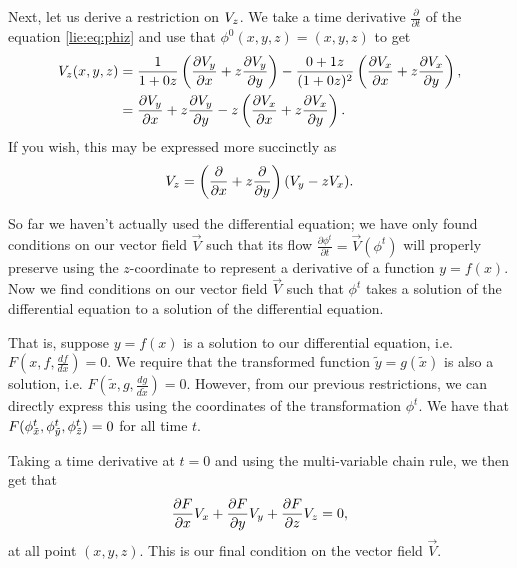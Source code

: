 Next, let us derive a restriction on \(V_z\). We take a time derivative \(\frac{\partial}{\partial t}\)
of the equation \ref{lie:eq:phiz} and use that \(\phi^0(x,y,z) = (x,y,z)\) to get
\begin{align}
V_z (x, y,z) & = \frac{1}{1 + 0z} \left( \frac{\partial V_y}{\partial x} + z \frac{\partial V_y}{\partial y}\right)
        - \frac{0 + 1z} {(1 + 0z)^2} \left( \frac{\partial V_x}{\partial x} 
                + z \frac{\partial V_x}{\partial y}\right), \\
& =  \frac{\partial V_y}{\partial x} + z \frac{\partial V_y}{\partial y} 
        - z\left( \frac{\partial V_x}{\partial x} + z \frac{\partial V_x}{\partial y}\right).
\end{align}
If you wish, this may be expressed more succinctly as 
\begin{equation}
V_z = \left(\frac{\partial}{\partial x} + z\frac{\partial}{\partial y} \right) (V_y - zV_x).
\end{equation}

So far we haven't actually used the differential equation; we have only found conditions on our vector field
\(\vec V\) such that its flow \(\frac{\partial \phi^t}{\partial t} = \vec V(\phi^t)\) will properly
preserve using the \(z\)-coordinate to represent a derivative of a function \(y = f(x)\). Now we find
conditions on our vector field \(\vec V\) such that \(\phi^t\) takes a solution of the differential equation
to a solution of the differential equation.

That is, suppose \(y = f(x)\) is a solution to our differential equation, 
i.e. \(F\left(x, f, \frac{df}{dx}\right) = 0\). We require that the transformed function \(\tilde y = g(\tilde x)\)
is also a solution, i.e. \(F\left(\tilde x, g, \frac{dg}{d\tilde x}\right) = 0\). However, from our
previous restrictions, we can directly express this using the coordinates of the transformation \(\phi^t\). We have
that \(F(\phi_{\tilde x}^t, \phi_{\tilde y}^t, \phi_{\tilde z}^t) = 0\) for all time \(t\).

Taking a time derivative at \(t = 0\) and using the multi-variable chain rule, we then get that
\begin{equation}
\frac{\partial F}{\partial x}V_x + \frac{\partial F}{\partial y}V_y +  \frac{\partial F}{\partial z} V_z = 0,
\end{equation}
at all point \((x, y, z)\). This is our final condition on the vector field \(\vec V\).

